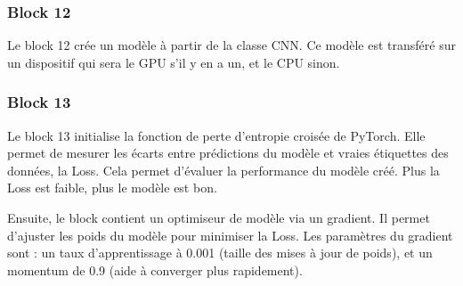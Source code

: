 \documentclass{article}
\begin{document}
\subsubsection{Block 12}
Le block 12 crée un modèle à partir de la classe CNN. Ce modèle est transféré sur un dispositif qui sera le GPU s'il y en a un, et le CPU sinon.

\subsubsection{Block 13}
Le block 13 initialise la fonction de perte d'entropie croisée de PyTorch. Elle permet de mesurer les écarts entre prédictions du modèle et vraies étiquettes des données, la Loss. Cela permet d'évaluer la performance du modèle créé. Plus la Loss est faible, plus le modèle est bon.

Ensuite, le block contient un optimiseur de modèle via un gradient. Il permet d'ajuster les poids du modèle pour minimiser la Loss. Les paramètres du gradient sont : un taux d'apprentissage à 0.001 (taille des mises à jour de poids), et un momentum de 0.9 (aide à converger plus rapidement).
\newpage
\end{document}
